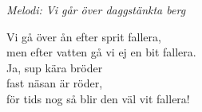 {\footnotesize\textit{Melodi: Vi går över daggstänkta berg}}\par
\vspace{10pt}
Vi gå över ån efter sprit fallera,\\
men efter vatten gå vi ej en bit fallera.\\
Ja, sup kära bröder\\
fast näsan är röder,\\
för tids nog så blir den väl vit fallera!
